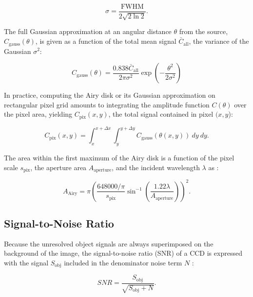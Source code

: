 \begin{equation} \label{eq:airy_variance}
  \sigma = \frac{\mathrm{FWHM}}{2 \sqrt{2 \ln{2}}}.
\end{equation}

The full Gaussian approximation at an angular distance $\theta$ from the source, $C_\mathrm{gauss}(\theta)$, is given as a function of the total mean signal $\bar{C}_\mathrm{all}$, the variance of the Gaussian $\sigma^2$:

\begin{equation} \label{eq:airy_gaussian}
  C_\mathrm{gauss}(\theta) = \frac{0.838 \bar{C}_\mathrm{all}}{2 \pi \sigma^2} \exp\left( - \frac{\theta^2}{2 \sigma^2} \right)
\end{equation}

In practice, computing the Airy disk or its Gaussian approximation on rectangular pixel grid amounts to integrating the amplitude function $C(\theta)$ over the pixel area, yielding $C_\mathrm{pix}(x, y)$, the total signal contained in pixel $(x,y$):

\begin{equation} \label{eq:pix_values_gauss}
  C_\mathrm{pix}(x, y) = \int_{x}^{x + \Delta x} \int_{y}^{y + \Delta y}{C_\mathrm{gauss}(\theta(x, y))} \: dy \: dy.
\end{equation}

The area within the first maximum of the Airy disk is a function of the pixel scale $s_\mathrm{pix}$, the aperture area $A_\mathrm{aperture}$, and the incident wavelength $\lambda$ as \cite{frueh2019notes}:

\begin{equation} \label{eq:airy_area}
  A_\mathrm{Airy} = \pi \left(\frac{648000 / \pi}{s_\mathrm{pix}} \sin^{-1}\left(\frac{1.22 \lambda}{A_\mathrm{aperture}}\right) \right)^2.
\end{equation}

\subsection{Signal-to-Noise Ratio}

Because the unresolved object signals are always superimposed on the background of the image, the signal-to-noise ratio (SNR) of a CCD is expressed with the signal $S_\mathrm{obj}$ included in the denominator noise term $N$ \cite{frueh2019notes}:

\begin{equation} \label{eq:ccd_snr}
  SNR = \frac{S_\mathrm{obj}}{\sqrt{S_\mathrm{obj}+N}}.
\end{equation}

